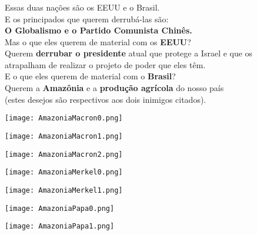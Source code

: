\documentclass[aspectratio=169]{beamer}
\begin{document}
\begin{frame}
	  \frametitle{}
	  \framesubtitle{}
	    \centering
	  \small
		Essas duas nações são os EEUU e o Brasil.\\
		E os principados que querem derrubá-las são: \\
		    \vspace{.5cm}
\textbf{		{\large O Globalismo e o Partido Comunista Chinês.}\\}
    \vspace{.5cm}
		Mas o que eles querem de material com os \textbf{EEUU}?\\
		Querem \textbf{derrubar o presidente} atual que protege a Israel e que os \\
		atrapalham de realizar o projeto de poder que eles têm.\\
		\vspace{.5cm}
		E o que eles querem de material com o \textbf{Brasil}?\\
		Querem a \textbf{Amazônia} e a \textbf{produção agrícola} do nosso país \\
		(estes desejos são respectivos aos dois inimigos citados).\\
	\end{frame} 


	\begin{frame}
	  \texttt{[image: AmazoniaMacron0.png]}
	\end{frame}
	
		\begin{frame}
	  \texttt{[image: AmazoniaMacron1.png]}
	\end{frame}
	
		\begin{frame}
	  \texttt{[image: AmazoniaMacron2.png]}
	\end{frame}
	
		\begin{frame}
	  \texttt{[image: AmazoniaMerkel0.png]}
	\end{frame}
	
			\begin{frame}
	  \texttt{[image: AmazoniaMerkel1.png]}
	\end{frame}
	
				\begin{frame}
	  \texttt{[image: AmazoniaPapa0.png]}
	\end{frame}
	
				\begin{frame}
	  \texttt{[image: AmazoniaPapa1.png]}
	\end{frame}
\end{document}
